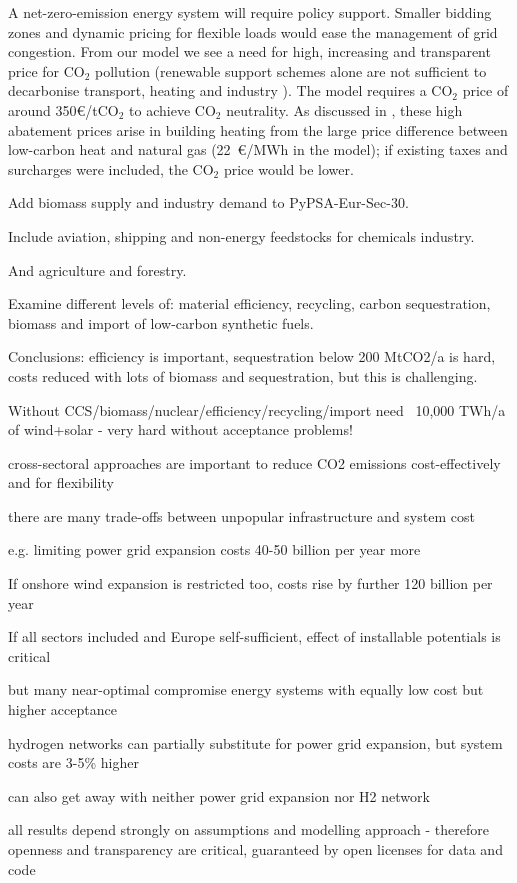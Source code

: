 A net-zero-emission energy system will require policy support.
Smaller bidding zones and dynamic pricing for flexible loads would
ease the management of grid congestion. From our model we see a need
for high, increasing and transparent price for CO$_2$ pollution
(renewable support schemes alone are not sufficient to decarbonise
transport, heating and industry \cite{ZHU2019622}). The model requires
a CO$_2$ price of around 350\euro/tCO$_2$ to achieve CO$_2$
neutrality. As discussed in \cite{BROWN2018720}, these high abatement
prices arise in building heating from the large price difference
between low-carbon heat and natural gas (22~\euro/MWh in the model);
if existing taxes and surcharges were included, the CO$_2$ price would
be lower.



Add biomass supply and industry demand to PyPSA-Eur-Sec-30.

Include aviation, shipping and non-energy feedstocks for chemicals industry.

And agriculture and forestry.

Examine different levels of: material efficiency, recycling, carbon
sequestration, biomass and import of low-carbon synthetic fuels.

Conclusions: efficiency is important, sequestration below 200 MtCO2/a is hard,
costs reduced with lots of biomass and sequestration, but this is challenging.

Without CCS/biomass/nuclear/efficiency/recycling/import need ~10,000 TWh/a of
wind+solar - very hard without acceptance problems!

cross-sectoral approaches are important to reduce CO2 emissions cost-effectively and for flexibility

there are many trade-offs between unpopular infrastructure and system cost

e.g. limiting power grid expansion costs 40-50 billion per year more

If onshore wind expansion is restricted too, costs rise by further 120 billion per year

If all sectors included and Europe self-sufficient, effect of installable potentials is critical

but many near-optimal compromise energy systems with equally low cost but higher acceptance

hydrogen networks can partially substitute for power grid expansion, but system costs are
3-5\% higher

can also get away with neither power grid expansion nor H2 network

all results depend strongly on assumptions and modelling approach
- therefore openness and transparency are critical, guaranteed by open licenses for data and code